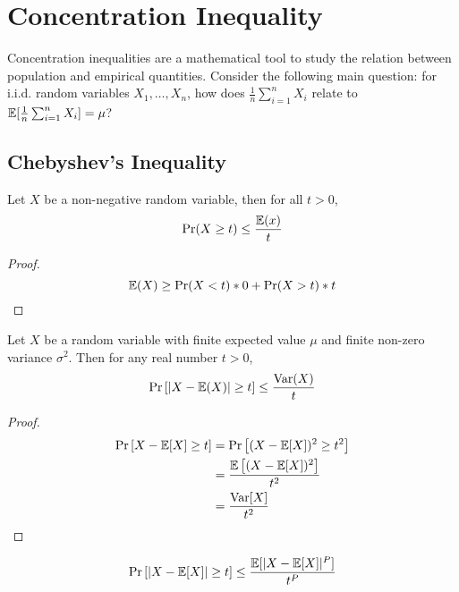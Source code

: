 \chapter{Concentration Inequality}


Concentration inequalities are a mathematical tool to study the relation between population 
and empirical quantities. Consider the following main question: for i.i.d. random variables 
\(X_1, \ldots, X_n\), how does \(\frac{1}{n}\sum_{i=1}^n X_i\) relate to 
\(\mathbb{E}[\frac{1}{n}\sum_{i=1}^n X_i] = \mu\)? 


\section{Chebyshev's Inequality}

\begin{lemma}\label{def:Markov}
    Let \(X\) be a non-negative random variable, then for all \(t > 0\), 
    \[
        \Pr (X \geq t) \leq \frac{\mathbb{E}(x)}{t}  
    \]

    \begin{proof}
        \[
        \mathbb{E}(X) \geq \Pr(X < t) * 0 + \Pr(X > t) * t 
        \]
    \end{proof}
\end{lemma}



\begin{theorem}
    Let \(X\) be a random variable with finite expected value \(\mu\) and finite non-zero 
    variance \(\sigma^2\). Then for any real number \(t > 0\), 
    \[
        \Pr \left[  \lvert X - \mathbb{E}(X)\rvert \geq t  \right] \leq \frac{\text{Var}(X)}{t}  
    \]

    \begin{proof}
        \begin{align*}
            \Pr \left[ X - \mathbb{E}[X] \geq t \right] &= \Pr \left[ (X - \mathbb{E}[X])^2 \geq t^2 \right] \\
                                               &= \frac{\mathbb{E}\left[ (X - \mathbb{E}[X])^2 \right]}{t^2} \\ 
                                               &= \frac{\text{Var}[X]}{t^2}
        \end{align*}
    \end{proof}
\end{theorem}

\begin{remark}
    \[
    \Pr \left[  \lvert X - \mathbb{E}[X] \rvert \geq t \right] \leq \frac{\mathbb{E}[\lvert X - \mathbb{E}[X] \rvert^P]}{t^P}
    \]
\end{remark}

